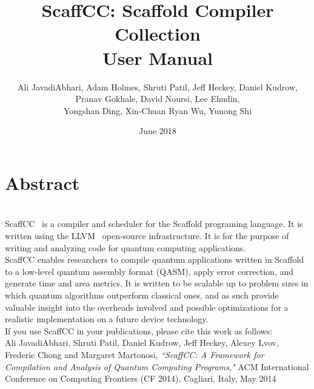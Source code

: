 \documentclass[12pt]{report}
\begin{document}
\title{
    {ScaffCC: Scaffold Compiler Collection}\\
    {\large User Manual}\\
}


\author{Ali JavadiAbhari, Adam Holmes, Shruti Patil, Jeff Heckey, Daniel Kudrow,\\ Pranav Gokhale, David Noursi, Lee Ehudin, \\
Yongshan Ding, Xin-Chuan Ryan Wu, Yunong Shi}

\date{June 2018}



\maketitle

\chapter*{Abstract}
~\\

ScaffCC~\cite{scaffcc} is a compiler and scheduler for the Scaffold programing language. It is written using the LLVM~\cite{LLVM} open-source infrastructure. It is for the purpose of writing and analyzing code for quantum computing applications.\\

ScaffCC enables researchers to compile quantum applications written in Scaffold to a low-level quantum assembly format (QASM), apply error correction, and generate time and area metrics. It is written to be scalable up to problem sizes in which quantum algorithms outperform classical ones, and as such provide valuable insight into the overheads involved and possible optimizations for a realistic implementation on a future device technology.\\

If you use ScaffCC in your publications, please cite this work as follows:\\

Ali JavadiAbhari, Shruti Patil, Daniel Kudrow, Jeff Heckey, Alexey Lvov, Frederic Chong and Margaret Martonosi, {\em``ScaffCC: A Framework for Compilation and Analysis of Quantum Computing Programs,"} ACM International Conference on Computing Frontiers (CF 2014), Cagliari, Italy, May 2014\\

\tableofcontents










\end{document}
